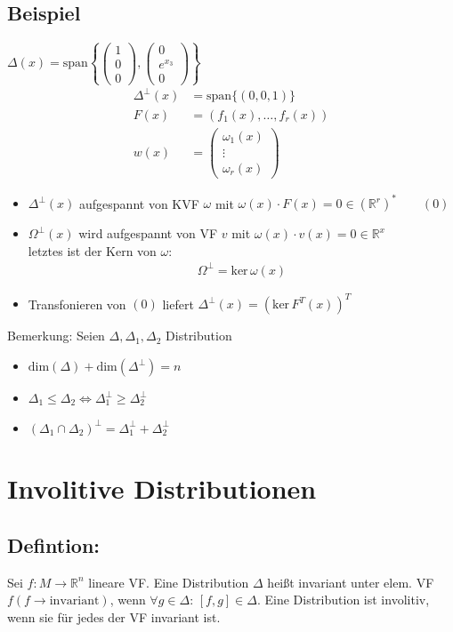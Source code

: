\documentclass[ngerman]{tudscrreprt}
\begin{document}
\subsection*{Beispiel}
$\Delta(x) = \text{span}\left\{ \begin{pmatrix} 1\\ 0\\ 0 \end{pmatrix}, \begin{pmatrix} 0\\ e^{x_3}\\ 0 \end{pmatrix} \right\}$
\begin{align*}
\Delta^\perp (x)&= \text{span}\{ (0, 0, 1) \}\\ 
F(x) &= (f_1(x), \dots, f_r(x))\\ 
w(x) &= \begin{pmatrix} \omega_1(x)\\ \vdots\\ \omega_r(x) \end{pmatrix}
\end{align*}
\begin{itemize}
\item $\Delta^\perp(x) $ aufgespannt von KVF $\omega$ mit $\omega(x) \cdot F(x) = 0 \in (\mathbb{R}^r)^*\qquad (0) $
\item $\Omega^\perp(x) $ wird aufgespannt von VF $v$ mit $\omega(x)\cdot v(x) = 0 \in \mathbb{R}^x$\\ letztes ist der Kern von $\omega:$ \begin{align*}
\Omega^{\perp} = \text{ker} \,\omega(x) \end{align*}
\item Transfonieren von $(0)$ liefert $\Delta^\perp (x) = (\text{ker} \,F^T (x))^T$
\end{itemize}
Bemerkung: Seien $\Delta, \Delta_1, \Delta_2$ Distribution
\begin{itemize}
\item $\text{dim}(\Delta) + \text{dim}(\Delta^\perp) = n $
\item $\Delta_1 \le \Delta_2 \iff \Delta_1^\perp \ge \Delta_2^\perp $
\item $(\Delta_1 \cap \Delta_2)^\perp = \Delta_1^\perp + \Delta_2^\perp $
\end{itemize}
\section{Involitive Distributionen}
\subsection*{Defintion:} Sei $f: M\to \mathbb{R}^n$ lineare VF. Eine Distribution $\Delta$ heißt invariant unter elem. VF $f(f\to \text{invariant})$, wenn $\forall g\in \Delta$: $[f,g]\in \Delta$. Eine Distribution ist involitiv, wenn sie für jedes der VF invariant ist. 
\end{document}
